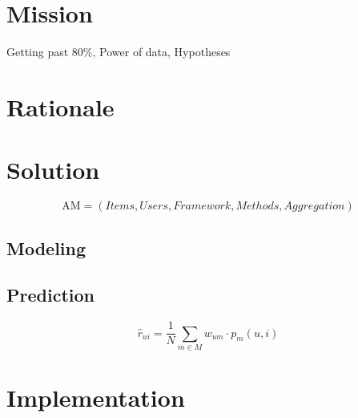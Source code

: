 \section{Mission}

Getting past 80\%,
Power of data,
Hypotheses

\section{Rationale}

\section{Solution}

\begin{equation*}
  \mathrm{AM} = (Items, Users, Framework, Methods, Aggregation)
\end{equation*}


\subsection{Modeling}
\subsection{Prediction}

\begin{equation*}
  \hat{r}_{ui} = \frac{1}{N} \sum_{m \in M} w_{um} \cdot p_m(u,i)
\end{equation*}


\section{Implementation}      




